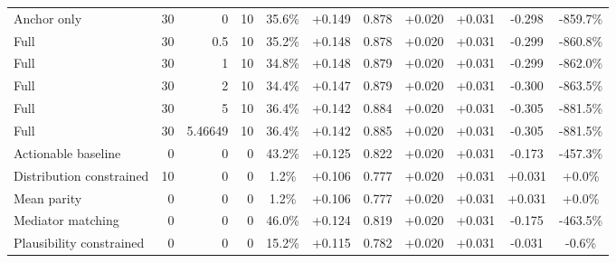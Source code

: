 \begin{table}[htbp]
\begin{tabular}{lrrrccccccc}
Anchor only & 30 & 0 & 10 & 35.6\% & +0.149 & 0.878 & +0.020 & +0.031 & -0.298 & -859.7\% \\
Full & 30 & 0.5 & 10 & 35.2\% & +0.148 & 0.878 & +0.020 & +0.031 & -0.299 & -860.8\% \\
Full & 30 & 1 & 10 & 34.8\% & +0.148 & 0.879 & +0.020 & +0.031 & -0.299 & -862.0\% \\
Full & 30 & 2 & 10 & 34.4\% & +0.147 & 0.879 & +0.020 & +0.031 & -0.300 & -863.5\% \\
Full & 30 & 5 & 10 & 36.4\% & +0.142 & 0.884 & +0.020 & +0.031 & -0.305 & -881.5\% \\
Full & 30 & 5.46649 & 10 & 36.4\% & +0.142 & 0.885 & +0.020 & +0.031 & -0.305 & -881.5\% \\
Actionable baseline & 0 & 0 & 0 & 43.2\% & +0.125 & 0.822 & +0.020 & +0.031 & -0.173 & -457.3\% \\
Distribution constrained & 10 & 0 & 0 & 1.2\% & +0.106 & 0.777 & +0.020 & +0.031 & +0.031 & +0.0\% \\
Mean parity & 0 & 0 & 0 & 1.2\% & +0.106 & 0.777 & +0.020 & +0.031 & +0.031 & +0.0\% \\
Mediator matching & 0 & 0 & 0 & 46.0\% & +0.124 & 0.819 & +0.020 & +0.031 & -0.175 & -463.5\% \\
Plausibility constrained & 0 & 0 & 0 & 15.2\% & +0.115 & 0.782 & +0.020 & +0.031 & -0.031 & -0.6\% \\
\bottomrule
\end{tabular}
\end{table}